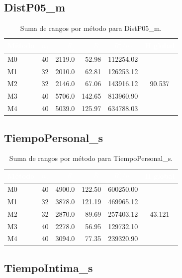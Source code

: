 \documentclass[12pt,a4paper,oneside]{book}
\begin{document}
\subsection{DistP05\_m}

\begin{table}[H]
\centering
\small
\caption{Suma de rangos por método para DistP05\_m.}
\begin{tabular}{lcrrcc}
\toprule
\rowcolor{primary}
\textcolor{white}{\textbf{Método}} & \textcolor{white}{$n_j$} & \textcolor{white}{$R_j$} & \textcolor{white}{$\bar{R}_j$} & \textcolor{white}{$R_j^2/n_j$} & \textcolor{white}{H global} \\
\midrule
M0 & 40 & 2119.0 & 52.98 & 112254.02 & \multirow{5}{*}{90.537} \\
M1 & 32 & 2010.0 & 62.81 & 126253.12 & \\
M2 & 32 & 2146.0 & 67.06 & 143916.12 & \\
M3 & 40 & 5706.0 & 142.65 & 813960.90 & \\
M4 & 40 & 5039.0 & 125.97 & 634788.03 & \\
\bottomrule
\end{tabular}
\end{table}

\subsection{TiempoPersonal\_s}

\begin{table}[H]
\centering
\small
\caption{Suma de rangos por método para TiempoPersonal\_s.}
\begin{tabular}{lcrrcc}
\toprule
\rowcolor{primary}
\textcolor{white}{\textbf{Método}} & \textcolor{white}{$n_j$} & \textcolor{white}{$R_j$} & \textcolor{white}{$\bar{R}_j$} & \textcolor{white}{$R_j^2/n_j$} & \textcolor{white}{H global} \\
\midrule
M0 & 40 & 4900.0 & 122.50 & 600250.00 & \multirow{5}{*}{43.121} \\
M1 & 32 & 3878.0 & 121.19 & 469965.12 & \\
M2 & 32 & 2870.0 & 89.69 & 257403.12 & \\
M3 & 40 & 2278.0 & 56.95 & 129732.10 & \\
M4 & 40 & 3094.0 & 77.35 & 239320.90 & \\
\bottomrule
\end{tabular}
\end{table}

\subsection{TiempoIntima\_s}
\end{document}
